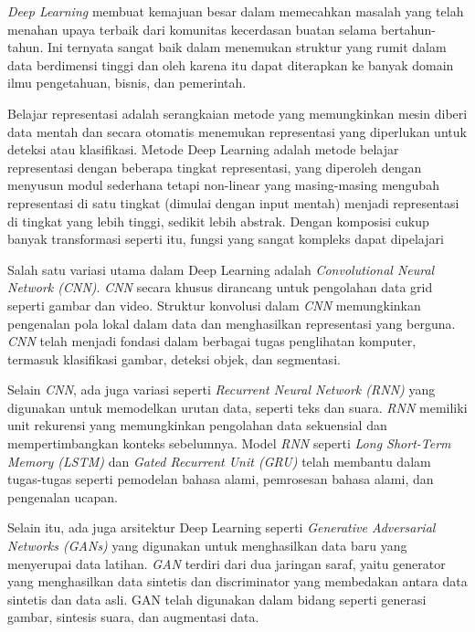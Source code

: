 \textit{Deep Learning} membuat kemajuan besar dalam memecahkan masalah yang telah menahan upaya terbaik dari komunitas kecerdasan buatan selama bertahun-tahun. Ini ternyata sangat baik dalam menemukan struktur yang rumit dalam data berdimensi tinggi dan oleh karena itu dapat diterapkan ke banyak domain ilmu pengetahuan, bisnis, dan pemerintah. \cite{deng2014deep}

Belajar representasi adalah serangkaian metode yang memungkinkan mesin diberi data mentah dan secara otomatis menemukan representasi yang diperlukan untuk deteksi atau klasifikasi. Metode Deep Learning adalah metode belajar representasi dengan beberapa tingkat representasi, yang diperoleh dengan menyusun modul sederhana tetapi non-linear yang masing-masing mengubah representasi di satu tingkat (dimulai dengan input mentah) menjadi representasi di tingkat yang lebih tinggi, sedikit lebih abstrak. Dengan komposisi cukup banyak transformasi seperti itu, fungsi yang sangat kompleks dapat dipelajari \cite{smith2007teaching}

Salah satu variasi utama dalam Deep Learning adalah \textit{Convolutional Neural Network (CNN)}. \textit{CNN} secara khusus dirancang untuk pengolahan data grid seperti gambar dan video. Struktur konvolusi dalam \textit{CNN} memungkinkan pengenalan pola lokal dalam data dan menghasilkan representasi yang berguna. \textit{CNN} telah menjadi fondasi dalam berbagai tugas penglihatan komputer, termasuk klasifikasi gambar, deteksi objek, dan segmentasi.

Selain \textit{CNN}, ada juga variasi seperti \textit{Recurrent Neural Network (RNN)} yang digunakan untuk memodelkan urutan data, seperti teks dan suara. \textit{RNN} memiliki unit rekurensi yang memungkinkan pengolahan data sekuensial dan mempertimbangkan konteks sebelumnya. Model \textit{RNN} seperti \textit{Long Short-Term Memory (LSTM)} dan \textit{Gated Recurrent Unit (GRU)} telah membantu dalam tugas-tugas seperti pemodelan bahasa alami, pemrosesan bahasa alami, dan pengenalan ucapan.

Selain itu, ada juga arsitektur Deep Learning seperti \textit{Generative Adversarial Networks (GANs)} yang digunakan untuk menghasilkan data baru yang menyerupai data latihan. \textit{GAN} terdiri dari dua jaringan saraf, yaitu generator yang menghasilkan data sintetis dan discriminator yang membedakan antara data sintetis dan data asli. GAN telah digunakan dalam bidang seperti generasi gambar, sintesis suara, dan augmentasi data.

